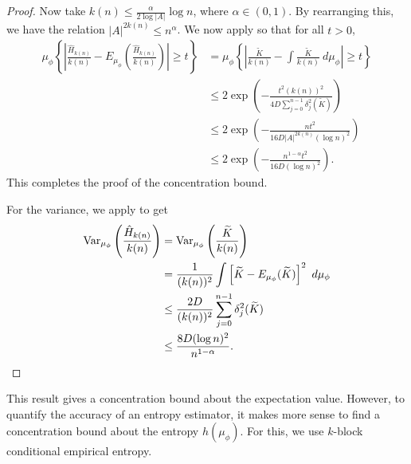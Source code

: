 \begin{theorem}
\begin{proof}
		Now take $k(n) \leq \frac{\alpha}{2\log{|A|}}\log{n}$, where $\alpha \in (0, 1)$. By rearranging this, we have the relation $|A|^{2k(n)} \leq n^\alpha$. We now apply  so that for all $t > 0$,
		\begin{align*}
			\mu_\phi\left\{\left| \frac{\hat{H}_{k(n)}}{k(n)} - E_{\mu_\phi}\left(\frac{\hat{H}_{k(n)}}{k(n)}\right) \right| \geq t\right\} &= \mu_\phi\left\{\left| \frac{\tilde{K}}{k(n)} - \int{\frac{\tilde{K}}{k(n)}\ d\mu_\phi} \right| \geq t\right\} \\
				&\leq 2\exp\left(-\frac{t^2 (k(n))^2}{4D\sum_{j = 0}^{n - 1}{\delta_j^2(\tilde{K})}}\right) \\
				&\leq 2\exp\left(-\frac{nt^2}{16D|A|^{2k(n)} (\log{n})^2}\right) \\
				&\leq 2\exp\left(-\frac{n^{1 - \alpha} t^2}{16D (\log{n})^2}\right).
		\end{align*}
		This completes the proof of the concentration bound.
		
		For the variance, we apply  to get
		\begin{align*}
			\operatorname{Var}_{\mu_\phi}\left(\frac{\hat{H}_{k(n)}}{k(n)}\right) &= \operatorname{Var}_{\mu_\phi}\left(\frac{\widetilde{K}}{k(n)}\right) \\
				&= \frac{1}{(k(n))^2}\int{\left[\widetilde{K} - E_{\mu_\phi}(\widetilde{K})\right]^2\ d\mu_\phi} \\
				&\leq \frac{2D}{(k(n))^2}\sum_{j = 0}^{n - 1}{\delta_j^2(\widetilde{K})} \\
				&\leq \frac{8D (\log{n})^2}{n^{1 - \alpha}}.
		\end{align*}
	\end{proof}
\end{theorem}

This result gives a concentration bound about the expectation value. However, to quantify the accuracy of an entropy estimator, it makes more sense to find a concentration bound about the entropy $h(\mu_\phi)$. For this, we use $k$-block conditional empirical entropy.

